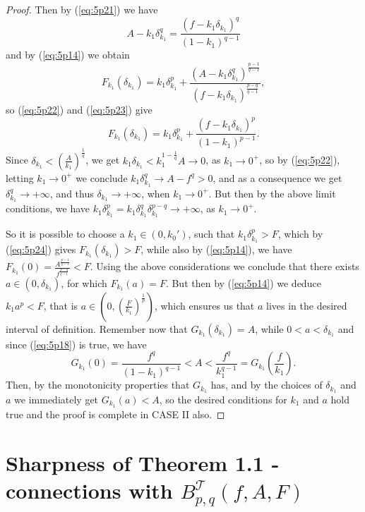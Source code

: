 \documentclass{article}
\numberwithin{equation}{section}
\theoremstyle{definition}
\theoremstyle{remark}
\newcommand{\mc}[1]{\mathcal{#1}}
\begin{document}
\begin{proof}
Then by (\ref{eq:5p21}) we have
\begin{equation}\label{eq:5p22}
A-k_1\delta_{k_1}^q=\frac{(f-k_1\delta_{k_1})^q}{(1-k_1)^{q-1}}
\end{equation}
and by (\ref{eq:5p14}) we obtain
\begin{equation}\label{eq:5p23}
F_{k_1}(\delta_{k_1})=k_1\delta_{k_1}^p+\frac{(A-k_1\delta_{k_1}^q)^\frac{p-1}{q-1}}{(f-k_1\delta_{k_1})^\frac{p-q}{q-1}},
\end{equation}
so (\ref{eq:5p22}) and (\ref{eq:5p23}) give
\begin{equation}\label{eq:5p24}
F_{k_1}(\delta_{k_1})=k_1\delta_{k_1}^p+\frac{(f-k_1\delta_{k_1})^p}{(1-k_1)^{p-1}}.
\end{equation}
Since $\delta_{k_1}<(\frac{A}{k_1})^{\frac{1}{q}}$, we get $k_1\delta_{k_1}<k_1^{1-\frac{1}{q}}A \rightarrow 0$, as $k_1\rightarrow 0^+$, so by (\ref{eq:5p22}), letting $k_1\rightarrow 0^+$ we conclude 
$k_1\delta_{k_1}^q \rightarrow A-f^q>0$, and as a consequence we get
$\delta_{k_1}^q \rightarrow +\infty$, and thus $\delta_{k_1} \rightarrow +\infty$, when $k_1\rightarrow 0^+$. But then by the above limit conditions, we have
$k_1\delta_{k_1}^p=k_1\delta_{k_1}^q \delta_{k_1}^{p-q} \rightarrow +\infty$, as $k_1\rightarrow 0^+$.

So it is possible to choose a $k_1\in (0,k_0')$, such that $k_1\delta_{k_1}^p>F$, which by (\ref{eq:5p24}) gives $F_{k_1}(\delta_{k_1})>F$, while also by (\ref{eq:5p14}), we have $F_{k_1}(0)=\frac{A^\frac{p-1}{q-1}}{f^\frac{p-q}{q-1}}<F$. Using the above considerations we conclude that there exists $a\in(0,\delta_{k_1})$, for which $F_{k_1}(a)=F$. But then by (\ref{eq:5p14}) we deduce $k_1a^p<F$, that is 
$a\in (0,(\frac{F}{k_1})^{\frac{1}{p}})$, which ensures us that $a$ lives in the desired interval of definition. Remember now that 
$G_{k_1}(\delta_{k_1})=A$, while $0<a<\delta_{k_1}$ and since (\ref{eq:5p18}) is true, we have
$$G_{k_1}(0)=\frac{f^q}{(1-k_1)^{q-1}}<A<\frac{f^q}{k_1^{q-1}}=G_{k_1}(\frac{f}{k_1}).$$
Then, by the monotonicity properties that $G_{k_1}$ has, and by the choices of $\delta_{k_1}$ and $a$ we immediately get $G_{k_1}(a)<A$, so the desired conditions for $k_1$ and $a$ hold true and the proof is complete in CASE II also.

\end{proof}
%
%
%
%
%
\section{Sharpness of Theorem 1.1 - connections with $B_{p,q}^{\mc T}(f,A,F)$ } \label{sec:6}
\end{document}

